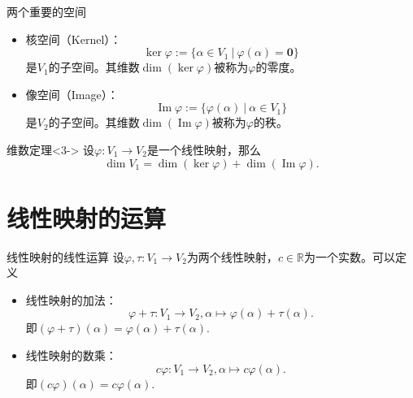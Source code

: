 \begin{frame}

\begin{block}{两个重要的空间}
\begin{itemize}
\item<1-> 核空间（Kernel）：
\[\ker\varphi := \{\alpha \in V_1 \ |\ \varphi(\alpha) = \mathbf{0}\}\]
是$V_1$的子空间。其维数$\dim(\ker\varphi)$被称为$\varphi$的零度。
\item<2-> 像空间（Image）：
\[\operatorname{Im}\varphi := \{\varphi(\alpha) \ |\ \alpha \in V_1\}\]
是$V_2$的子空间。其维数$\dim(\operatorname{Im}\varphi)$被称为$\varphi$的秩。
\end{itemize}
\end{block}

\begin{block}{维数定理}<3->
设$\varphi: V_1 \to V_2$是一个线性映射，那么
\[\dim V_1 = \dim(\ker\varphi) + \dim(\operatorname{Im}\varphi).\]
\end{block}

\end{frame}


\section{线性映射的运算}


\begin{frame}

\begin{block}{线性映射的线性运算}
设$\varphi,\tau: V_1 \to V_2$为两个线性映射，$c\in\mathbb{R}$为一个实数。可以定义
\begin{itemize}
\item 线性映射的加法：
\[\varphi + \tau: V_1 \to V_2, \alpha \mapsto \varphi(\alpha) + \tau(\alpha).\]
即$(\varphi + \tau)(\alpha) = \varphi(\alpha) + \tau(\alpha)$.
\item 线性映射的数乘：
\[c\varphi: V_1 \to V_2, \alpha \mapsto c\varphi(\alpha) .\]
即$(c\varphi)(\alpha) = c\varphi(\alpha)$.
\end{itemize}
\end{block}

\end{frame}


